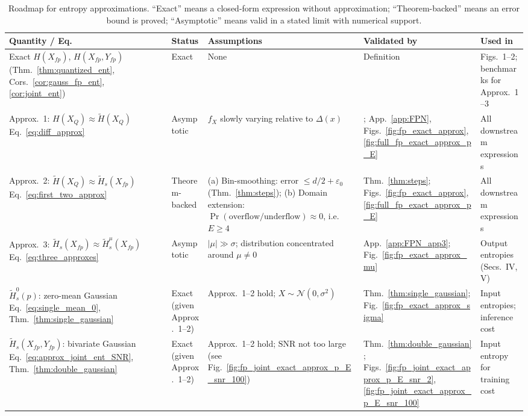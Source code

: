 \documentclass[12pt,onecolumn, margin=1in]{IEEEtran}
\newcommand{\Xfp}{X_{fp}}
\newcommand{\Yfp}{Y_{fp}}
\begin{document}
\begin{table}[htbp]
\centering
\caption{Roadmap for entropy approximations. ``Exact'' means a closed-form expression without approximation; ``Theorem-backed'' means an error bound is proved; ``Asymptotic'' means valid in a stated limit with numerical support.}
\label{tab:approx_audit}
\small
\begin{tabular}{p{3.0cm} p{1.6cm} p{3.6cm} p{2.4cm} p{2.4cm}}
\toprule
\textbf{Quantity / Eq.} & \textbf{Status} & \textbf{Assumptions} & \textbf{Validated by} & \textbf{Used in} \\
\midrule
Exact $H(\Xfp)$, $H(\Xfp, \Yfp)$ \newline (Thm.~\ref{thm:quantized_ent}, Cors.~\ref{cor:gauss_fp_ent}, \ref{cor:joint_ent}) & Exact & None & Definition & Figs.~1--2; benchmarks for Approx.~1--3 \\
\addlinespace
Approx.~1: $H(X_Q) \approx \tilde H(X_Q)$ \newline Eq.~\eqref{eq:diff_approx} & Asymptotic & $f_X$ slowly varying relative to $\Delta(x)$ & \cite{kostina_data_2017}; App.~\ref{app:FPN}, Figs.~\ref{fig:fp_exact_approx}, \ref{fig:full_fp_exact_approx_p_E} & All downstream expressions \\
\addlinespace
Approx.~2: $\tilde H(X_Q) \approx \tilde H_s(X_{fp})$ \newline Eq.~\eqref{eq:first_two_approx} & Theorem-backed & (a) Bin-smoothing: error $\leq d/2 + \varepsilon_0$ (Thm.~\ref{thm:steps}); (b) Domain extension: $\Pr(\text{overflow/underflow}) \approx 0$, i.e.\ $E \geq 4$ & Thm.~\ref{thm:steps}; Figs.~\ref{fig:fp_exact_approx}, \ref{fig:full_fp_exact_approx_p_E} & All downstream expressions \\
\addlinespace
Approx.~3: $\tilde H_s(X_{fp}) \approx \tilde H_s^\mu(X_{fp})$ \newline Eq.~\eqref{eq:three_approxes} & Asymptotic & $|\mu| \gg \sigma$; distribution concentrated around $\mu \neq 0$ & App.~\ref{app:FPN_app3}; Fig.~\ref{fig:fp_exact_approx_mu} & Output entropies (Secs.~IV, V) \\
\addlinespace
$\tilde H_s^0(p)$: zero-mean Gaussian \newline Eq.~\eqref{eq:single_mean_0}, Thm.~\ref{thm:single_gaussian} & Exact (given Approx.~1--2) & Approx.~1--2 hold; $X \sim \mathcal{N}(0, \sigma^2)$ & Thm.~\ref{thm:single_gaussian}; Fig.~\ref{fig:fp_exact_approx_sigma} & Input entropies; inference cost \\
\addlinespace
$\tilde H_s(\Xfp, \Yfp)$: bivariate Gaussian \newline Eq.~\eqref{eq:approx_joint_ent_SNR}, Thm.~\ref{thm:double_gaussian} & Exact (given Approx.~1--2) & Approx.~1--2 hold; $\mathrm{SNR}$ not too large (see Fig.~\ref{fig:fp_joint_exact_approx_p_E_snr_100}) & Thm.~\ref{thm:double_gaussian}; Figs.~\ref{fig:fp_joint_exact_approx_p_E_snr_2}, \ref{fig:fp_joint_exact_approx_p_E_snr_100} & Input entropy for training cost \\

\end{tabular}
\end{table}
\end{document}
